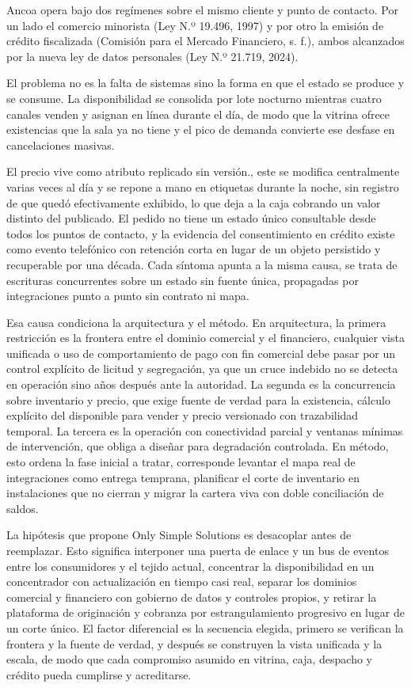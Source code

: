 \documentclass[11pt]{article}
\begin{document}
Ancoa opera bajo dos regímenes sobre el mismo cliente y punto de contacto. Por un lado el comercio minorista (Ley N.º 19.496, 1997) y por otro la emisión de crédito fiscalizada (Comisión para el Mercado Financiero, s. f.), ambos alcanzados por la nueva ley de datos personales (Ley N.º 21.719, 2024).

El problema no es la falta de sistemas sino la forma en que el estado se produce y se consume. La disponibilidad se consolida por lote nocturno mientras cuatro canales venden y asignan en línea durante el día, de modo que la vitrina ofrece existencias que la sala ya no tiene y el pico de demanda convierte ese desfase en cancelaciones masivas.

El precio vive como atributo replicado sin versión., este se modifica centralmente varias veces al día y se repone a mano en etiquetas durante la noche, sin registro de que quedó efectivamente exhibido, lo que deja a la caja cobrando un valor distinto del publicado. El pedido no tiene un estado único consultable desde todos los puntos de contacto, y la evidencia del consentimiento en crédito existe como evento telefónico con retención corta en lugar de un objeto persistido y recuperable por una década. Cada síntoma apunta a la misma causa, se trata de escrituras concurrentes sobre un estado sin fuente única, propagadas por integraciones punto a punto sin contrato ni mapa.

Esa causa condiciona la arquitectura y el método. En arquitectura, la primera restricción es la frontera entre el dominio comercial y el financiero, cualquier vista unificada o uso de comportamiento de pago con fin comercial debe pasar por un control explícito de licitud y segregación, ya que un cruce indebido no se detecta en operación sino años después ante la autoridad. La segunda es la concurrencia sobre inventario y precio, que exige fuente de verdad para la existencia, cálculo explícito del disponible para vender y precio versionado con trazabilidad temporal. La tercera es la operación con conectividad parcial y ventanas mínimas de intervención, que obliga a diseñar para degradación controlada. En método, esto ordena la fase inicial a tratar, corresponde levantar el mapa real de integraciones como entrega temprana, planificar el corte de inventario en instalaciones que no cierran y migrar la cartera viva con doble conciliación de saldos.

La hipótesis que propone Only Simple Solutions es desacoplar antes de reemplazar. Esto significa interponer una puerta de enlace y un bus de eventos entre los consumidores y el tejido actual, concentrar la disponibilidad en un concentrador con actualización en tiempo casi real, separar los dominios comercial y financiero con gobierno de datos y controles propios, y retirar la plataforma de originación y cobranza por estrangulamiento progresivo en lugar de un corte único. El factor diferencial es la secuencia elegida, primero se verifican la frontera y la fuente de verdad, y después se construyen la vista unificada y la escala, de modo que cada compromiso asumido en vitrina, caja, despacho y crédito pueda cumplirse y acreditarse.
\end{document}
